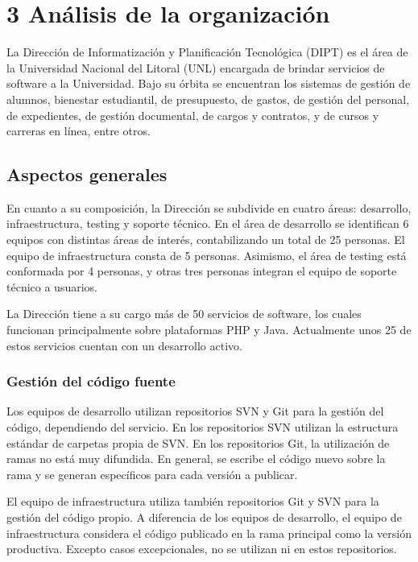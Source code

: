 \chapter{3 Análisis de la organización}

La Dirección de Informatización y Planificación Tecnológica (DIPT) es
el área de la Universidad Nacional del Litoral (UNL) encargada de
brindar servicios de software a la Universidad. Bajo su órbita se
encuentran los sistemas de gestión de alumnos, bienestar estudiantil,
de presupuesto, de gastos, de gestión del personal, de expedientes, de
gestión documental, de cargos y contratos, y de cursos y carreras en
línea, entre otros.

\section{Aspectos generales}

En cuanto a su composición, la Dirección se subdivide en cuatro áreas:
desarrollo, infraestructura, testing y soporte técnico. En el área de
desarrollo se identifican 6 equipos con distintas áreas de interés,
contabilizando un total de 25 personas. El equipo de infraestructura
consta de 5 personas. Asimismo, el área de testing está conformada por
4 personas, y otras tres personas integran el equipo de soporte
técnico a usuarios.

La Dirección tiene a su cargo más de 50 servicios de software, los
cuales funcionan principalmente sobre plataformas PHP y
Java. Actualmente unos 25 de estos servicios cuentan con un desarrollo
activo.

\subsection{Gestión del código fuente}

Los equipos de desarrollo utilizan repositorios SVN y Git para la
gestión del código, dependiendo del servicio. En los repositorios SVN
utilizan la estructura estándar de carpetas
 propia de SVN. En los repositorios Git,
la utilización de ramas no está muy difundida. En general, se escribe
el código nuevo sobre la rama  y se generan
 específicos para cada versión a publicar.

El equipo de infraestructura utiliza también repositorios Git y SVN
para la gestión del código propio. A diferencia de los equipos de
desarrollo, el equipo de infraestructura considera el código publicado
en la rama principal como la versión productiva. Excepto casos
excepcionales, no se utilizan  ni  en
estos repositorios.

